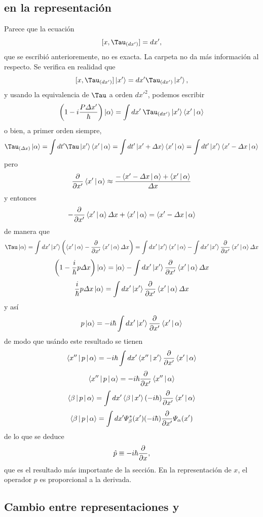\documentclass[10pt,oneside]{CBFT_book}
\begin{document}
\subsection{ en la representación }

Parece que la ecuación
\[
	[x,\Tau_{(dx')}] = dx',
\]
que se escribió anterioremente, no es exacta. La carpeta no da más información al respecto.
Se verifica en realidad que
\[
	[x,\Tau_{(dx')}] \Ket{x'} = dx' \Tau_{(dx')} \Ket{x'},
\]
y usando la equivalencia de $\Tau$ a orden ${dx'}^2$, podemos escribir
\[
	\left( 1 - i\frac{P\Delta x'}{\hbar}\right) \Ket{\a} = 
	\int dx' \: \Tau_{(dx')} \Ket{x'} \Braket{x'|\a}
\]
o bien, a primer orden siempre,
\[
	\Tau_{(\Delta x)} \Ket{\alpha} = \int dt' \Tau\Ket{x'}\Braket{x'|\alpha} = 
		\int dt' \Ket{x'+ \Delta x}\Braket{x'|\alpha} = \int dt' \Ket{x'}\Braket{x'-\Delta x|\alpha}
\]
pero
\[
	\frac{\partial^{\hspace{-0.05em}} {}}{\partial {x'}^{\hspace{-0.05em}}} \Braket{x'|\alpha} \approx \frac{ -\Braket{x'-\Delta x|\alpha} + \Braket{x'|\alpha} }{\Delta x}
\]
y entonces
\[
	-\frac{\partial^{\hspace{-0.05em}} {}}{\partial {x'}^{\hspace{-0.05em}}} \Braket{x'|\alpha} \Delta x + \Braket{x'|\alpha}  = \Braket{x'-\Delta x|\alpha}
\]
de manera que
\[
	\Tau\Ket{\alpha} = \int dx' \Ket{x'}\left( \Braket{x'|\alpha} -\dpar{}{x'} \Braket{x'|\alpha} \Delta x \right) =
	\int dx' \Ket{x'} \Braket{x'|\alpha} - \int dx' \Ket{x'}  \dpar{}{x'} \Braket{x'|\alpha} \Delta x 
\]
\[
	\left( 1 - \frac{i}{\hbar}p\Delta x \right) \Ket{\alpha} = 
		\Ket{\alpha} - \int dx' \Ket{x'}  \frac{\partial^{\hspace{-0.05em}} {}}{\partial {x'}^{\hspace{-0.05em}}} \Braket{x'|\alpha} \Delta x
\]
\[
	\frac{i}{\hbar}p\Delta x \Ket{\alpha} = \int dx' \Ket{x'}  \frac{\partial^{\hspace{-0.05em}} {}}{\partial {x'}^{\hspace{-0.05em}}} \Braket{x'|\alpha} \Delta x
\]
y así
\[
	p\Ket{\alpha} = -i\hbar \int dx' \Ket{x'}  \frac{\partial^{\hspace{-0.05em}} {}}{\partial {x'}^{\hspace{-0.05em}}} \Braket{x'|\alpha}
\]
de modo que usándo este resultado se tienen
\[
	\Braket{x''|p|\alpha} = -i\hbar \int dx' \Braket{x''|x'}  \frac{\partial^{\hspace{-0.05em}} {}}{\partial {x'}^{\hspace{-0.05em}}} \Braket{x'|\alpha}
\]
\[
	\Braket{x''|p|\alpha} = -i\hbar \frac{\partial^{\hspace{-0.05em}} {}}{\partial {x'}^{\hspace{-0.05em}}} \Braket{x''|\alpha}
\]
\[
	\Braket{\beta|p|\alpha} = \int dx' \Braket{\beta|x'} (-i\hbar) \frac{\partial^{\hspace{-0.05em}} {}}{\partial {x'}^{\hspace{-0.05em}}} \Braket{x'|\alpha}
\]
\[
	\Braket{\beta|p|\alpha} = \int dx' \Psi_\beta^*(x') (-i\hbar) \frac{\partial^{\hspace{-0.05em}} {}}{\partial {x'}^{\hspace{-0.05em}}} \Psi_\alpha(x')
\]
de lo que se deduce 
\[
	\hat{p} \equiv - i \hbar \frac{\partial^{\hspace{-0.05em}} {}}{\partial {x}^{\hspace{-0.05em}}},
\]
que es el resultado más importante de la sección.
En la representación de $x$, el operador $p$ es proporcional a la derivada.

\subsection{Cambio entre representaciones  y  }
\end{document}
